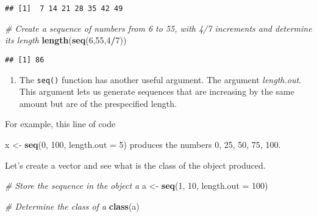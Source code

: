 \documentclass[
]{article}
\newenvironment{Shaded}{\begin{snugshade}}{\end{snugshade}}
\newcommand{\CommentTok}[1]{\textcolor[rgb]{0.56,0.35,0.01}{\textit{#1}}}
\newcommand{\DataTypeTok}[1]{\textcolor[rgb]{0.13,0.29,0.53}{#1}}
\newcommand{\DecValTok}[1]{\textcolor[rgb]{0.00,0.00,0.81}{#1}}
\newcommand{\FloatTok}[1]{\textcolor[rgb]{0.00,0.00,0.81}{#1}}
\newcommand{\KeywordTok}[1]{\textcolor[rgb]{0.13,0.29,0.53}{\textbf{#1}}}
\newcommand{\NormalTok}[1]{#1}
\newcommand{\OperatorTok}[1]{\textcolor[rgb]{0.81,0.36,0.00}{\textbf{#1}}}
\newcommand{\StringTok}[1]{\textcolor[rgb]{0.31,0.60,0.02}{#1}}
\providecommand{\tightlist}{%
  \setlength{\itemsep}{0pt}\setlength{\parskip}{0pt}}
\begin{document}
\begin{verbatim}
## [1]  7 14 21 28 35 42 49
\end{verbatim}

\begin{Shaded}
\begin{Highlighting}[]
\CommentTok{# Create a sequence of numbers from 6 to 55, with 4/7 increments and determine its length}
\KeywordTok{length}\NormalTok{(}\KeywordTok{seq}\NormalTok{(}\DecValTok{6}\NormalTok{,}\DecValTok{55}\NormalTok{,}\DecValTok{4}\OperatorTok{/}\DecValTok{7}\NormalTok{))}
\end{Highlighting}
\end{Shaded}

\begin{verbatim}
## [1] 86
\end{verbatim}

\begin{enumerate}
\def\labelenumi{\arabic{enumi}.}
\setcounter{enumi}{8}
\tightlist
\item
  The \texttt{seq()} function has another useful argument. The argument
  \emph{length.out}. This argument lets us generate sequences that are
  increasing by the same amount but are of the prespecified length.
\end{enumerate}

For example, this line of code

\begin{Shaded}
\begin{Highlighting}[]
\NormalTok{x <-}\StringTok{ }\KeywordTok{seq}\NormalTok{(}\DecValTok{0}\NormalTok{, }\DecValTok{100}\NormalTok{, }\DataTypeTok{length.out =} \DecValTok{5}\NormalTok{)}
\NormalTok{produces the numbers }\DecValTok{0}\NormalTok{, }\DecValTok{25}\NormalTok{, }\DecValTok{50}\NormalTok{, }\DecValTok{75}\NormalTok{, }\FloatTok{100.}
\end{Highlighting}
\end{Shaded}

Let's create a vector and see what is the class of the object produced.

\begin{Shaded}
\begin{Highlighting}[]
\CommentTok{# Store the sequence in the object a}
\NormalTok{a <-}\StringTok{ }\KeywordTok{seq}\NormalTok{(}\DecValTok{1}\NormalTok{, }\DecValTok{10}\NormalTok{, }\DataTypeTok{length.out =} \DecValTok{100}\NormalTok{)}

\CommentTok{# Determine the class of a}
\KeywordTok{class}\NormalTok{(a)}
\end{Highlighting}
\end{Shaded}
\end{document}
